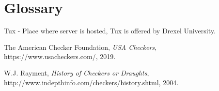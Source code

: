 \documentclass{scrreprt}
\begin{document}
\section{Glossary}
Tux - Place where server is hosted, Tux is offered by Drexel University.


\begin{thebibliography}{9}

  The American Checker Foundation,
  \textit{USA Checkers},
  https://www.usacheckers.com/,
  2019.

W.J. Rayment,
\textit{History of Checkers or Draughts},
http://www.indepthinfo.com/checkers/history.shtml,
2004.

\end{thebibliography}
\end{document}

